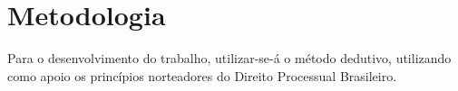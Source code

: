 \chapter{Metodologia}

	Para o desenvolvimento do trabalho, utilizar-se-á o método dedutivo, utilizando como apoio os princípios norteadores do Direito Processual Brasileiro. 